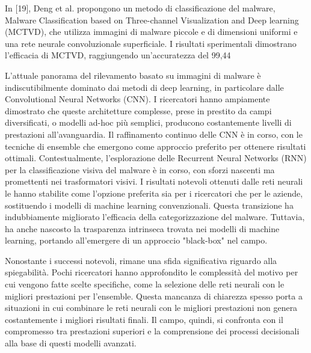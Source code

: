 In [19], Deng et al. propongono un metodo di classificazione del malware, Malware Classification based on Three-channel Visualization and Deep learning (MCTVD), che utilizza immagini di malware piccole e di dimensioni uniformi e una rete neurale convoluzionale superficiale. I risultati sperimentali dimostrano l'efficacia di MCTVD, raggiungendo un'accuratezza del 99,44%

L'attuale panorama del rilevamento basato su immagini di malware è indiscutibilmente dominato dai metodi di deep learning, in particolare dalle Convolutional Neural Networks (CNN). I ricercatori hanno ampiamente dimostrato che queste architetture complesse, prese in prestito da campi diversificati, o modelli ad-hoc più semplici, producono costantemente livelli di prestazioni all'avanguardia. Il raffinamento continuo delle CNN è in corso, con le tecniche di ensemble che emergono come approccio preferito per ottenere risultati ottimali. Contestualmente, l'esplorazione delle Recurrent Neural Networks (RNN) per la classificazione visiva del malware è in corso, con sforzi nascenti ma promettenti nei trasformatori visivi. I risultati notevoli ottenuti dalle reti neurali le hanno stabilite come l'opzione preferita sia per i ricercatori che per le aziende, sostituendo i modelli di machine learning convenzionali. Questa transizione ha indubbiamente migliorato l'efficacia della categorizzazione del malware. Tuttavia, ha anche nascosto la trasparenza intrinseca trovata nei modelli di machine learning, portando all'emergere di un approccio "black-box" nel campo.

Nonostante i successi notevoli, rimane una sfida significativa riguardo alla spiegabilità. Pochi ricercatori hanno approfondito le complessità del motivo per cui vengono fatte scelte specifiche, come la selezione delle reti neurali con le migliori prestazioni per l'ensemble. Questa mancanza di chiarezza spesso porta a situazioni in cui combinare le reti neurali con le migliori prestazioni non genera costantemente i migliori risultati finali. Il campo, quindi, si confronta con il compromesso tra prestazioni superiori e la comprensione dei processi decisionali alla base di questi modelli avanzati.

